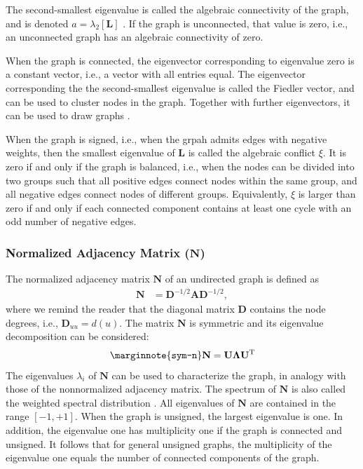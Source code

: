 \documentclass{article}
\begin{document}
The second-smallest eigenvalue is called the algebraic connectivity of
the graph, and is denoted $a = \lambda_2[\mathbf L]$ \citep{b652}.  If the graph is
unconnected, that value is zero, i.e., an unconnected graph has an
algebraic connectivity of zero. 

When the graph is connected, the eigenvector corresponding to eigenvalue
zero is a constant vector, i.e., a vector with all entries equal. The
eigenvector corresponding the the second-smallest eigenvalue is called
the Fiedler vector, and can be used to cluster nodes in the
graph. Together with further eigenvectors, it can be used to draw
graphs \citep{kunegis:signed-kernels}. 

When the graph is signed, i.e., when the grpah admits edges with
negative weights, then the smallest eigenvalue of $\mathbf L$ is called
the algebraic conflict $\xi$. It is zero if and only if the graph is balanced,
i.e., when the nodes can be divided into two groups such that all
positive edges connect nodes within the same group, and all negative
edges connect nodes of different groups.  Equivalently, $\xi$ is larger
than zero if and only if each connected component contains at least one
cycle with an odd number of negative edges. 

\subsubsection{Normalized Adjacency Matrix ($\mathbf N$)}
The normalized adjacency matrix $\mathbf N$ of an undirected graph is
defined as 
\begin{align*}
  \mathbf N &= \mathbf D^{-1/2} \mathbf A \mathbf D^{-1/2},
\end{align*}
where we remind the reader that the diagonal matrix $\mathbf D$
contains the node degrees, i.e., $\mathbf D_{uu} = d(u)$. 
The matrix $\mathbf N$ is symmetric and its eigenvalue decomposition can
be considered:
\begin{align}
  \marginnote{\texttt{sym-n}}
  \mathbf N = \mathbf U \mathbf \Lambda \mathbf U^{\mathrm T}
\end{align}
The eigenvalues $\lambda_i$ of $\mathbf N$ can be used to characterize
the graph, in analogy with those of the nonnormalized adjacency
matrix.
The spectrum of $\mathbf N$ is also called the weighted spectral
distribution \citep{b864}.
All eigenvalues of $\mathbf N$ are contained in the range
$[-1,+1]$.  When the graph is unsigned, the largest eigenvalue is one.
In addition, the eigenvalue one has multiplicity one if the graph is
connected and unsigned.  It follows that for general unsigned graphs,
the multiplicity of the eigenvalue one equals the number of connected
components of the graph. 
\end{document}
